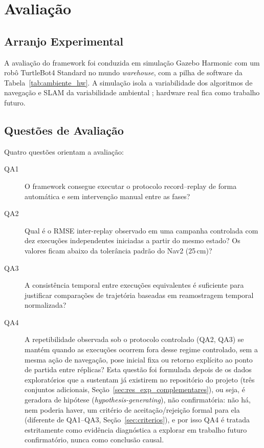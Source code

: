 \chapter{Avaliação}
\label{chap:avaliacao}

\section{Arranjo Experimental}
\label{sec:arranjo}

A avaliação do framework foi conduzida em simulação Gazebo Harmonic com um robô
TurtleBot4 Standard no mundo \textit{warehouse}, com a pilha de software da
Tabela~\ref{tab:ambiente_hw}. A simulação isola a variabilidade dos algoritmos
de navegação e SLAM da variabilidade ambiental \cite{amigoni2010}; hardware real
fica como trabalho futuro.

\section{Questões de Avaliação}
\label{sec:questoes}

Quatro questões orientam a avaliação:

\begin{description}
    \item[QA1] O framework consegue executar o protocolo record--replay de forma
    automática e sem intervenção manual entre as fases?

    \item[QA2] Qual é o RMSE inter-replay observado em uma campanha controlada
    com dez execuções independentes iniciadas a partir do mesmo estado? Os
    valores ficam abaixo da tolerância padrão do Nav2 (25\,cm)?

    \item[QA3] A consistência temporal entre execuções equivalentes é suficiente
    para justificar comparações de trajetória baseadas em reamostragem temporal
    normalizada?

    \item[QA4] A repetibilidade observada sob o protocolo controlado (QA2, QA3)
    se mantém quando as execuções ocorrem fora desse regime controlado, sem
    a mesma ação de navegação, pose inicial fixa ou retorno explícito ao ponto
    de partida entre réplicas? Esta questão foi formulada depois de os dados
    exploratórios que a sustentam já existirem no repositório do projeto
    (três conjuntos adicionais, Seção~\ref{sec:res_exp_complementares}), ou
    seja, é geradora de hipótese (\textit{hypothesis-generating}), não
    confirmatória: não há, nem poderia haver, um critério de aceitação/rejeição
    formal para ela (diferente de QA1--QA3, Seção~\ref{sec:criterios}), e por
    isso QA4 é tratada estritamente como evidência diagnóstica a explorar em
    trabalho futuro confirmatório, nunca como conclusão causal.
\end{description}


